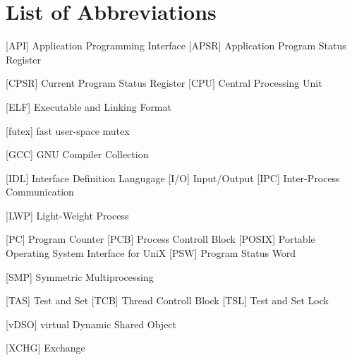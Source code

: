 
\chapter*{List of Abbreviations}

\begin{acronym} [POSIX]
 [API] {Application Programming Interface}
     [APSR] {Application Program Status Register}

 [CPSR] {Current Program Status Register}
 [CPU] {Central Processing Unit}


 [ELF] {Executable and Linking Format}

 [futex] {fast user-space mutex}

 [GCC] {GNU Compiler Collection}


 [IDL] {Interface Definition Langugage}
 [I/O] {Input/Output}
[IPC] {Inter-Process Communication}



 [LWP] {Light-Weight Process}




 [PC] {Program Counter}
 [PCB] {Process Controll Block}
 [POSIX] {Portable Operating System Interface for UniX}
 [PSW] {Program Status Word}



 [SMP] {Symmetric Multiprocessing}

 [TAS] {Test and Set}
 [TCB] {Thread Controll Block}
 [TSL] {Test and Set Lock}


 [vDSO] {virtual Dynamic Shared Object}


 [XCHG] {Exchange}



\end{acronym} 
